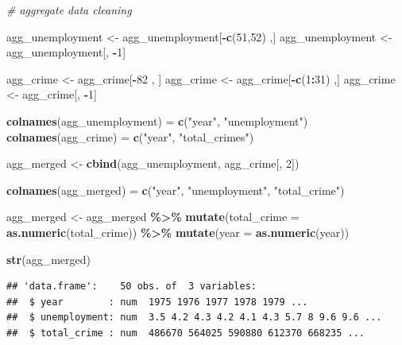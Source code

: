 \documentclass[
]{article}
\newenvironment{Shaded}{\begin{snugshade}}{\end{snugshade}}
\newcommand{\AttributeTok}[1]{\textcolor[rgb]{0.13,0.29,0.53}{#1}}
\newcommand{\CommentTok}[1]{\textcolor[rgb]{0.56,0.35,0.01}{\textit{#1}}}
\newcommand{\DecValTok}[1]{\textcolor[rgb]{0.00,0.00,0.81}{#1}}
\newcommand{\FunctionTok}[1]{\textcolor[rgb]{0.13,0.29,0.53}{\textbf{#1}}}
\newcommand{\NormalTok}[1]{#1}
\newcommand{\OtherTok}[1]{\textcolor[rgb]{0.56,0.35,0.01}{#1}}
\newcommand{\SpecialCharTok}[1]{\textcolor[rgb]{0.81,0.36,0.00}{\textbf{#1}}}
\newcommand{\StringTok}[1]{\textcolor[rgb]{0.31,0.60,0.02}{#1}}
\begin{document}
\begin{Shaded}
\begin{Highlighting}[]
\CommentTok{\# aggregate data cleaning}

\NormalTok{agg\_unemployment }\OtherTok{\textless{}{-}}\NormalTok{ agg\_unemployment[}\SpecialCharTok{{-}}\FunctionTok{c}\NormalTok{(}\DecValTok{51}\NormalTok{,}\DecValTok{52}\NormalTok{) ,]}
\NormalTok{agg\_unemployment }\OtherTok{\textless{}{-}}\NormalTok{ agg\_unemployment[, }\SpecialCharTok{{-}}\DecValTok{1}\NormalTok{]}

\NormalTok{agg\_crime }\OtherTok{\textless{}{-}}\NormalTok{ agg\_crime[}\SpecialCharTok{{-}}\DecValTok{82}\NormalTok{ , ]}
\NormalTok{agg\_crime }\OtherTok{\textless{}{-}}\NormalTok{ agg\_crime[}\SpecialCharTok{{-}}\FunctionTok{c}\NormalTok{(}\DecValTok{1}\SpecialCharTok{:}\DecValTok{31}\NormalTok{) ,]}
\NormalTok{agg\_crime }\OtherTok{\textless{}{-}}\NormalTok{ agg\_crime[, }\SpecialCharTok{{-}}\DecValTok{1}\NormalTok{]}

\FunctionTok{colnames}\NormalTok{(agg\_unemployment) }\OtherTok{=} \FunctionTok{c}\NormalTok{(}\StringTok{"year"}\NormalTok{, }\StringTok{"unemployment"}\NormalTok{)}
\FunctionTok{colnames}\NormalTok{(agg\_crime) }\OtherTok{=} \FunctionTok{c}\NormalTok{(}\StringTok{"year"}\NormalTok{, }\StringTok{"total\_crimes"}\NormalTok{)}

\NormalTok{agg\_merged }\OtherTok{\textless{}{-}} \FunctionTok{cbind}\NormalTok{(agg\_unemployment, agg\_crime[, }\DecValTok{2}\NormalTok{])}

\FunctionTok{colnames}\NormalTok{(agg\_merged) }\OtherTok{=} \FunctionTok{c}\NormalTok{(}\StringTok{"year"}\NormalTok{, }\StringTok{"unemployment"}\NormalTok{, }\StringTok{"total\_crime"}\NormalTok{)}

\NormalTok{agg\_merged }\OtherTok{\textless{}{-}}\NormalTok{ agg\_merged }\SpecialCharTok{\%\textgreater{}\%}
  \FunctionTok{mutate}\NormalTok{(}\AttributeTok{total\_crime =} \FunctionTok{as.numeric}\NormalTok{(total\_crime)) }\SpecialCharTok{\%\textgreater{}\%}
  \FunctionTok{mutate}\NormalTok{(}\AttributeTok{year =} \FunctionTok{as.numeric}\NormalTok{(year))}

\FunctionTok{str}\NormalTok{(agg\_merged)}
\end{Highlighting}
\end{Shaded}

\begin{verbatim}
## 'data.frame':    50 obs. of  3 variables:
##  $ year        : num  1975 1976 1977 1978 1979 ...
##  $ unemployment: num  3.5 4.2 4.3 4.2 4.1 4.3 5.7 8 9.6 9.6 ...
##  $ total_crime : num  486670 564025 590880 612370 668235 ...
\end{verbatim}
\end{document}
